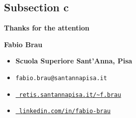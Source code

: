 \documentclass[aspectratio=169, 10pt]{beamer}
\theoremstyle{definition}
\begin{document}
\subsection{Subsection c}
{%
\begin{frame}{}
  \textbf{\Huge Thanks for the attention}\\
  \vspace{20pt}
  \begin{minipage}[h]{0.6\textwidth}
  {\large\bf Fabio Brau}
  \vspace{5pt}
  \begin{itemize}
    \item[\faUniversity] {\bf Scuola Superiore Sant'Anna, Pisa}
    \item[\Letter] \texttt{fabio.brau@santannapisa.it}
    \item[\faGlobe] \href{http://retis.santannapisa.it/~f.brau/}{\tt %
                    retis.santannapisa.it/\textasciitilde f.brau}
    \item[\faLinkedin]
      \href{https://www.linkedin.com/in/fabio-brau-153b54181}{\tt%
        linkedin.com/in/fabio-brau}
  \end{itemize}
  \end{minipage}
\end{frame}
}
\end{document}
